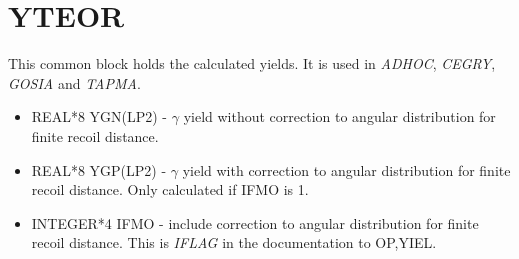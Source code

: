 \section{YTEOR}

This common block holds the calculated yields. It is used in \emph{ADHOC},
\emph{CEGRY}, \emph{GOSIA} and \emph{TAPMA}.

\begin{itemize}
\item REAL*8 YGN(LP2) - $\gamma$ yield without correction to angular
distribution for finite recoil distance.
\item REAL*8 YGP(LP2) - $\gamma$ yield with correction to angular
distribution for finite recoil distance. Only calculated if IFMO is 1.
\item INTEGER*4 IFMO - include correction to angular distribution for finite
recoil distance. This is \emph{IFLAG} in the documentation to OP,YIEL.
\end{itemize}
